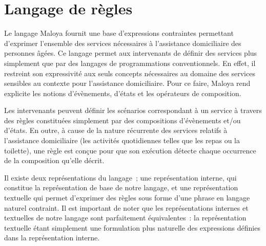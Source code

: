 

\section{Langage de règles}

Le langage Maloya fournit une base d'expressions contraintes
permettant d'exprimer l'ensemble des services nécessaires à
l'assistance domiciliaire des personnes âgées.  Ce langage permet aux
intervenants de définir des services plus simplement que par des
langages de programmations conventionnels.  En effet, il restreint son
expressivité aux seuls concepts nécessaires au domaine des services
sensibles au contexte pour l'assistance domiciliaire. Pour ce faire,
Maloya rend explicite les notions d'évènements, d'états et les
opérateurs de composition.  

Les intervenants peuvent définir les scénarios correspondant à un
service à travers des règles constituées simplement par des
compositions d'évènements et/ou d'états.  En outre, à cause de la
nature récurrente des services relatifs à l'assistance domiciliaire
(\eg les activités quotidiennes telles que les repas ou la toilette),
une règle est conçue pour que son exécution détecte chaque occurrence
de la composition qu'elle décrit.

Il existe deux représentations du langage~; une représentation interne,
qui constitue la représentation de base de notre langage, et une représentation
textuelle qui permet d'exprimer des règles sous forme d'une phrase en
langage naturel contraint.  Il est important de noter que les
représentations internes et textuelles de notre langage sont
parfaitement équivalentes~: la représentation textuelle étant simplement une
formulation plus naturelle des expressions définies dans la
représentation interne.

